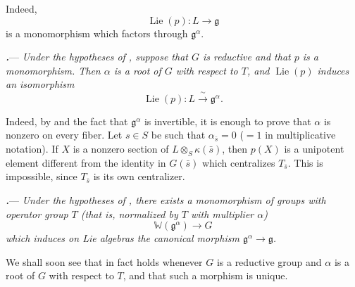 Indeed,
\[
  \operatorname{Lie}(p)\colon L\longrightarrow\mathfrak g
\]
is a monomorphism which factors through \(\mathfrak g^\alpha\).

\par\medskip\noindent
{}\textbf{\textit{.}}---
\textit{Under the hypotheses of , suppose that \(G\) is reductive
and that \(p\) is a monomorphism.  Then \(\alpha\) is a root of \(G\)
with respect to \(T\), and \(\operatorname{Lie}(p)\) induces an
isomorphism}
\[
  \operatorname{Lie}(p)\colon
  L\xrightarrow{\ \sim\ }\mathfrak g^\alpha.
\]

Indeed, by  and the fact that \(\mathfrak g^\alpha\) is
invertible, it is enough to prove that \(\alpha\) is nonzero on every
fiber.  Let \(s\in S\) be such that
\(\alpha_{\bar s}=0\) \textup{(\(=1\) in multiplicative notation)}.
If \(X\) is a nonzero section of
\(L\otimes_S\kappa(\bar s)\), then \(p(X)\) is a unipotent element
different from the identity in \(G(\bar s)\) which centralizes
\(T_{\bar s}\).  This is impossible, since \(T_{\bar s}\) is its own
centralizer.

\par\medskip\noindent
{}\textbf{\textit{.}}---
\textit{Under the hypotheses of , there exists a monomorphism of
groups with operator group \(T\) \textup{(that is, normalized by
\(T\) with multiplier \(\alpha\))}
\[
  \mathbb W(\mathfrak g^\alpha)\longrightarrow G
\]
which induces on Lie algebras the canonical morphism
\(\mathfrak g^\alpha\to\mathfrak g\).}

We shall soon see that  in fact holds whenever \(G\) is a
reductive group and \(\alpha\) is a root of \(G\) with respect to
\(T\), and that such a morphism is unique.

